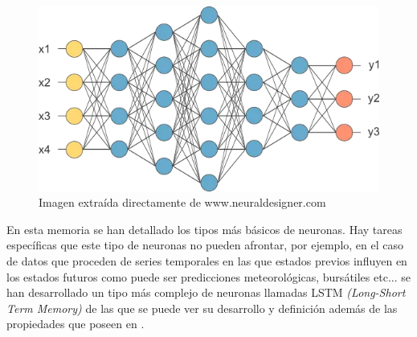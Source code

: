 \begin{figure}[ht]
\centering
\includegraphics[scale=0.35]{Documentos Extra/Imagenes/red-neuronal-grande.png}
\caption{Imagen extraída directamente de www.neuraldesigner.com}
\label{fig:estructura red neuronal}
\end{figure}


\noindent En esta memoria se han detallado los tipos más básicos de neuronas. Hay tareas específicas que este tipo de neuronas no pueden afrontar, por ejemplo, en el caso de datos que proceden de series temporales en las que estados previos influyen en los estados futuros como puede ser predicciones meteorológicas, bursátiles etc... se han desarrollado un tipo más complejo de neuronas llamadas LSTM \emph{(Long-Short Term Memory)} de las que se puede ver su desarrollo y definición además de las propiedades que poseen en \cite{Hochreiter 1997,Neural Designer}.

